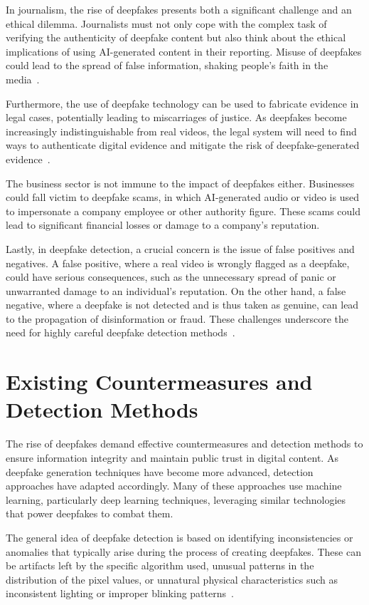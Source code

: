 In journalism, the rise of deepfakes presents both a significant
challenge and an ethical dilemma. Journalists must not only cope with
the complex task of verifying the authenticity of deepfake content
but also think about the ethical implications of using \ac{AI}-generated
content in their reporting. Misuse of deepfakes could lead to the spread of
false information, shaking people's faith in the media~\cite{doi:10.1177/2056305120903408}.

Furthermore, the use of deepfake technology can be used to fabricate evidence in
legal cases, potentially leading to miscarriages of justice. As deepfakes become
increasingly indistinguishable from real videos, the legal system will need to
find ways to authenticate digital evidence and mitigate the risk of deepfake-generated
evidence~\cite{chesney2019deep}.

The business sector is not immune to the impact of deepfakes either. Businesses
could fall victim to deepfake scams, in which \ac{AI}-generated audio or video
is used to impersonate a company employee or other authority figure.
These scams could lead to significant financial losses or damage to a
company's reputation.

Lastly, in deepfake detection, a crucial concern is the issue of
false positives and negatives. A false positive, where a real video is wrongly
flagged as a deepfake, could have serious consequences, such as the unnecessary
spread of panic or unwarranted damage to an individual's reputation. On the
other hand, a false negative, where a deepfake is not detected and is thus
taken as genuine, can lead to the propagation of disinformation or fraud.
These challenges underscore the need for highly careful deepfake detection methods~\cite{roessler2019faceforensicspp}.

\section{Existing Countermeasures and Detection Methods}\label{chapter:countermeasures}
The rise of deepfakes demand effective countermeasures and detection methods
to ensure information integrity and maintain public trust
in digital content. As deepfake generation techniques have become more advanced,
detection approaches have adapted accordingly. Many of these
approaches use machine learning, particularly deep learning techniques,
leveraging similar technologies that power deepfakes to combat them.

The general idea of deepfake detection is based on identifying inconsistencies
or anomalies that typically arise during the process of creating deepfakes. These
can be artifacts left by the specific algorithm used, unusual patterns in the
distribution of the pixel values, or unnatural physical characteristics
such as inconsistent lighting or improper blinking patterns~\cite{Agarwal_2019_CVPR_Workshops}.


